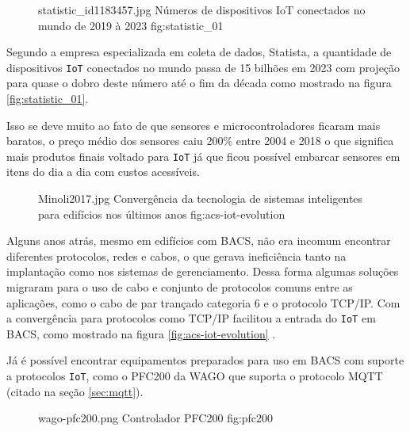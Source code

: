 \begin{figure}[h!]
    {statistic_id1183457.jpg}                 %
    {Números de dispositivos IoT conectados no mundo de 2019 à 2023}     %
    {fig:statistic_01}                      %
\end{figure}

Segundo a empresa especializada em coleta de dados, Statista, 
a quantidade de dispositivos \verb'IoT' conectados no mundo passa de 15 bilhões em 
2023 com projeção para quase o dobro deste número até o fim da década 
\cite{statista-iot-connected-devices} como mostrado na figura \ref{fig:statistic_01}. 

Isso se deve muito ao fato de que sensores e microcontroladores ficaram mais baratos, o 
preço médio dos sensores caiu 200\% entre 2004 e 2018 \cite{microsoft-1} o que significa
mais produtos finais voltado para \verb'IoT' já que ficou possível embarcar sensores em itens 
do dia a dia com custos acessíveis.

\begin{figure}[h!]
    {Minoli2017.jpg}                 %
    {Convergência da tecnologia de sistemas inteligentes para edifícios nos últimos anos}     %
    {fig:acs-iot-evolution}                      %
\end{figure}

Alguns anos atrás, mesmo em edifícios com BACS, não era incomum encontrar diferentes protocolos, 
redes e cabos, o que gerava ineficiência tanto na implantação como nos sistemas de gerenciamento. 
Dessa forma algumas soluções migraram para o uso de cabo e conjunto de protocolos comuns entre as 
aplicações, como o cabo de par trançado categoria 6 e o protocolo TCP/IP. 
Com a convergência para protocolos como TCP/IP facilitou a entrada do \verb'IoT' em BACS, 
como mostrado na figura 
\ref{fig:acs-iot-evolution} \cite{Minoli2017}.

Já é possível encontrar equipamentos preparados para uso em BACS com suporte a protocolos \verb'IoT',
como o PFC200 da WAGO que suporta o protocolo MQTT (citado na seção \ref{sec:mqtt}).

\begin{figure}[h!]
    {wago-pfc200.png}                 %
    {Controlador PFC200}     %
    {fig:pfc200}                      %
\end{figure}